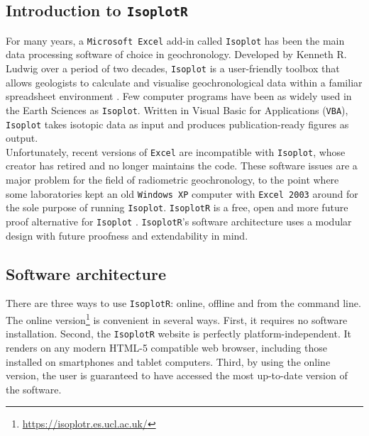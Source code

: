 \begin{refsection}
\chapter{Introduction to \texttt{IsoplotR}}
\label{ch:intro2IsoplotR}
  
For many years, a \texttt{Microsoft Excel} add-in called
\texttt{Isoplot} has been the main data processing software of choice
in geochronology. Developed by Kenneth R. Ludwig over a period of two
decades, \texttt{Isoplot} is a user-friendly toolbox that allows
geologists to calculate and visualise geochronological data within a
familiar spreadsheet environment \citep{ludwig1988, ludwig1999,
  ludwig2003, ludwig2012}.  Few computer programs have been as widely
used in the Earth Sciences as \texttt{Isoplot}. Written in Visual
Basic for Applications (\texttt{VBA}), \texttt{Isoplot} takes isotopic
data as input and produces publication-ready figures as output.\\

Unfortunately, recent versions of \texttt{Excel} are incompatible with
\texttt{Isoplot}, whose creator has retired and no longer maintains
the code. These software issues are a major problem for the field of
radiometric geochronology, to the point where some laboratories kept
an old \texttt{Windows~XP} computer with \texttt{Excel~2003} around
for the sole purpose of running \texttt{Isoplot}.  \texttt{IsoplotR}
is a free, open and more future proof alternative for \texttt{Isoplot}
\citep{vermeesch2018c}.  \texttt{IsoplotR}'s software architecture
uses a modular design with future proofness and extendability in mind.

\section{Software architecture}
\label{sec:architecture}

There are three ways to use \texttt{IsoplotR}: online, offline and
from the command line.\\

The online
version\footnote{\url{https://isoplotr.es.ucl.ac.uk/}} is
convenient in several ways. First, it requires no software
installation. Second, the \texttt{IsoplotR} website is perfectly
platform-independent. It renders on any modern HTML-5 compatible web
browser, including those installed on smartphones and tablet
computers. Third, by using the online version, the user is guaranteed
to have accessed the most up-to-date version of the software.\\


\end{refsection}
